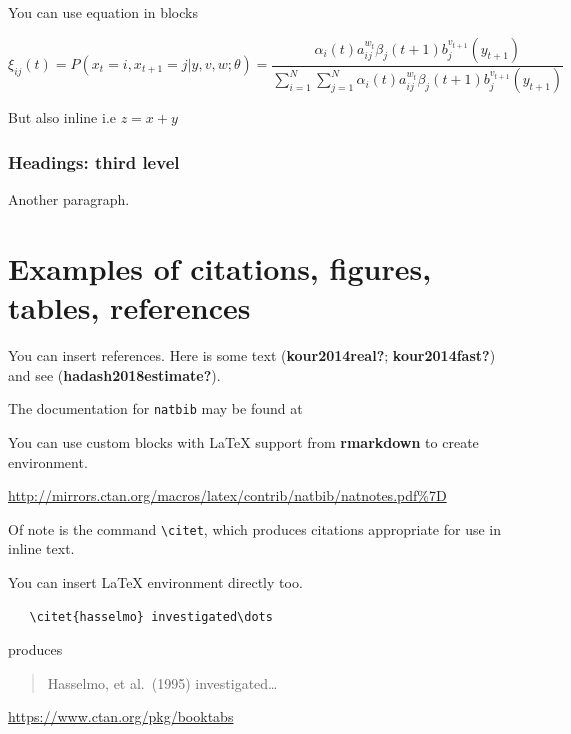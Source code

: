 \documentclass{article}
\begin{document}
You can use equation in blocks

\[
\xi _{ij}(t)=P(x_{t}=i,x_{t+1}=j|y,v,w;\theta)= {\frac {\alpha _{i}(t)a^{w_t}_{ij}\beta _{j}(t+1)b^{v_{t+1}}_{j}(y_{t+1})}{\sum _{i=1}^{N} \sum _{j=1}^{N} \alpha _{i}(t)a^{w_t}_{ij}\beta _{j}(t+1)b^{v_{t+1}}_{j}(y_{t+1})}}
\]

But also inline i.e \(z=x+y\)

\hypertarget{headings-third-level}{%
\subsubsection{Headings: third level}\label{headings-third-level}}

Another paragraph.

\hypertarget{examples-of-citations-figures-tables-references}{%
\section{Examples of citations, figures, tables,
references}\label{examples-of-citations-figures-tables-references}}

\label{sec:others}

You can insert references. Here is some text (\textbf{kour2014real?};
\textbf{kour2014fast?}) and see (\textbf{hadash2018estimate?}).

The documentation for \verb+natbib+ may be found at

You can use custom blocks with LaTeX support from \textbf{rmarkdown} to
create environment.

\begin{center}
\url{http://mirrors.ctan.org/macros/latex/contrib/natbib/natnotes.pdf\%7D}

\end{center}

Of note is the command \verb+\citet+, which produces citations
appropriate for use in inline text.

You can insert LaTeX environment directly too.

\begin{verbatim}
   \citet{hasselmo} investigated\dots
\end{verbatim}

produces

\begin{quote}
  Hasselmo, et al.\ (1995) investigated\dots
\end{quote}

\begin{center}
  \url{https://www.ctan.org/pkg/booktabs}
\end{center}
\end{document}
